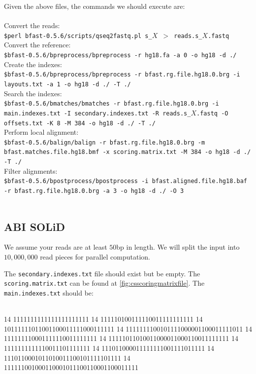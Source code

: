\documentclass[a4paper,12pt]{book}
\newcommand{\Version}{0.5.6}
\begin{document}
Given the above files, the commands we should execute are:
\\\\
Convert the reads:\\
{\tt \scriptsize \$perl bfast-\Version{}/scripts/qseq2fastq.pl s\_$X$ $>$ reads.s\_$X$.fastq\\}
Convert the reference:\\
{\tt \scriptsize \$bfast-\Version{}/bpreprocess/bpreprocess -r hg18.fa -a 0 -o hg18 -d ./\\}
Create the indexes:\\
{\tt \scriptsize \$bfast-\Version{}/bpreprocess/bpreprocess -r bfast.rg.file.hg18.0.brg -i layouts.txt -a 1 -o hg18 -d ./ -T ./\\}
Search the indexes:\\
{\tt \scriptsize \$bfast-\Version{}/bmatches/bmatches -r bfast.rg.file.hg18.0.brg -i main.indexes.txt -I secondary.indexes.txt -R reads.s\_$X$.fastq -O offsets.txt -K 8 -M 384 -o hg18 -d ./ -T ./\\}
Perform local alignment:\\
{\tt \scriptsize \$bfast-\Version{}/balign/balign -r bfast.rg.file.hg18.0.brg -m bfast.matches.file.hg18.bmf -x scoring.matrix.txt -M 384 -o hg18 -d ./ -T ./\\}
Filter alignments:\\
{\tt \scriptsize \$bfast-\Version{}/bpostprocess/bpostprocess -i bfast.aligned.file.hg18.baf -r bfast.rg.file.hg18.0.brg -a 3 -o hg18 -d ./ -O 3\\}
\\

\subsection{ABI SOLiD}
\label{sec:hg-settings-abi}
We assume your reads are at least $50$bp in length.
We will split the input into $10,000,000$ read pieces for parallel computation.

The {\tt secondary.indexes.txt} file should exist but be empty.
The {\tt scoring.matrix.txt} can be found at \autoref{fig:csscoringmatrixfile}. 
The {\tt main.indexes.txt} should be:\\
\\
\begin{boxedverbatim}
14 1111111111111111111111
14 111110100111110011111111111
14 10111111011001100011111000111111
14 1111111100101111000001100011111011
14 111111110001111110011111111
14 11111011010011000011000110011111111
14 1111111111110011101111111
14 111011000011111111001111011111
14 1110110001011010011100101111101111
14 111111001000110001011100110001100011111
\end{boxedverbatim}
\\
\end{document}
